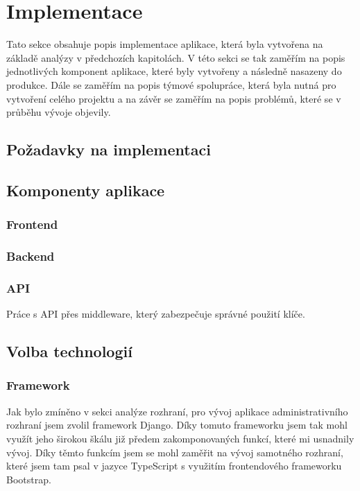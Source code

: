\chapter{Implementace}
\label{ch:implementation}
Tato sekce obsahuje popis implementace aplikace, která byla vytvořena na základě analýzy v předchozích kapitolách. V této sekci se tak zaměřím na popis jednotlivých komponent aplikace, které byly vytvořeny a následně nasazeny do produkce. Dále se zaměřím na popis týmové spolupráce, která byla nutná pro vytvoření celého projektu a na závěr se zaměřím na popis problémů, které se v průběhu vývoje objevily.

\section{Požadavky na implementaci}
\label{sec:implementation-requirements}

\section{Komponenty aplikace}
\label{sec:implementation-components}

\subsection{Frontend}
\label{subsec:implementation-frontend}

\subsection{Backend}
\label{subsec:implementation-backend}

\subsection{API}
\label{subsec:implementation-api}
Práce s API přes middleware, který zabezpečuje správné použití klíče.

\section{Volba technologií}
\label{sec:implementation-technologies}

\subsection{Framework}
\label{subsec:implementation-technologies-framework}
Jak bylo zmíněno v sekci analýze rozhraní, pro vývoj aplikace administrativního rozhraní jsem zvolil framework Django. Díky tomuto frameworku jsem tak mohl využít jeho širokou škálu již předem zakomponovaných funkcí, které mi usnadnily vývoj. Díky těmto funkcím jsem se mohl zaměřit na vývoj samotného rozhraní, které jsem tam psal v jazyce TypeScript s využitím frontendového frameworku Bootstrap.

